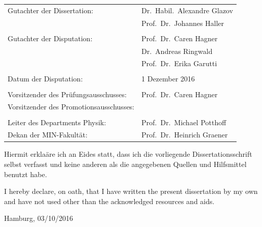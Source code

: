 \documentclass[oneside,11pt]{Classes/PhDthesisPSnPDF}
\begin{document}

\newpage
\thispagestyle{empty}
\vspace{12mm}
\begin{tabular}{ll}
Gutachter der Dissertation: & Dr.~Habil.~Alexandre Glazov \\
                            & Prof.~Dr.~Johannes Haller \\
    \\
Gutachter der Disputation:  & Prof.~Dr.~Caren Hagner \\
							              & Dr.~Andreas Ringwald \\
							              & Prof.~Dr.~Erika Garutti \\

    \\
Datum der Disputation: & 1 Dezember 2016 \\
\\
Vorsitzender des Pr\"ufungsausschusses: & Prof.~Dr.~Caren Hagner \\
Vorsitzender des Promotionsausschusses: & \\
    \\
Leiter des Departments Physik:          & Prof.~Dr.~Michael Potthoff\\
Dekan der MIN-Fakult\"at:               & Prof.~Dr.~Heinrich Graener
\end{tabular}

\vspace{10cm}
Hiermit erkla\"are ich an Eides statt, dass ich die vorliegende Dissertationsschrift selbst verfasst und keine anderen als die angegebenen Quellen und Hilfsmittel benutzt habe.

\vspace{1cm}
I hereby declare, on oath, that I have written the present dissertation by my own and have not used other than the acknowledged resources and aids.

\vspace{2cm}
\hspace{0.6\textwidth} Hamburg, 03/10/2016

\end{document}
